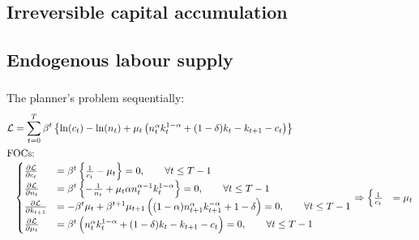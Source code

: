 \documentclass[]{article}
\begin{document}
\subsection{Irreversible capital accumulation}

\subsection{Endogenous labour supply}

\subsubsection{}
The planner's problem sequentially:
\begin{equation}
	\begin{split}
		\mathcal{L}& = \sum\limits_{t = 0}^T\beta^t\begin{Bmatrix}\ln(c_t) - \ln(n_t) + \mu_t\begin{pmatrix}n_t^\alpha k_t^{1 - \alpha} + (1 - \delta)k_t - k_{t+1} - c_t\end{pmatrix}\end{Bmatrix} \nonumber \\
		\intertext{FOCs:}
		&\begin{cases}
			\frac{\partial\mathcal{L}}{\partial c_t}& = \beta^t\begin{Bmatrix}\frac{1}{c_t} - \mu_t\end{Bmatrix} = 0, \qquad
			\forall t\leq T - 1 \\
			\frac{\partial\mathcal{L}}{\partial n_t}& = \beta^t\begin{Bmatrix}-\frac{1}{n_t} + \mu_t\alpha n_t^{\alpha - 1}k_t^{1 - \alpha}\end{Bmatrix} = 0, \qquad\forall t\leq T - 1 \\
			\frac{\partial\mathcal{L}}{\partial k_{t+1}}& = -\beta^t\mu_t + \beta^{t+1}\mu_{t+1}\begin{pmatrix}(1 - \alpha)n_{t+1}^\alpha k_{t+1}^{ - \alpha} + 1 - \delta\end{pmatrix} = 0, \qquad\forall t\leq T - 1 \\
			\frac{\partial\mathcal{L}}{\partial \mu_t}& = \beta^t\begin{pmatrix}n_t^\alpha k_t^{1 - \alpha} + (1 - \delta)k_t - k_{t+1} - c_t\end{pmatrix} = 0, \qquad\forall t\leq T-1
		\end{cases} \Rightarrow 
		\begin{cases}
			\frac{1}{c_t}& = \mu_t \\

\end{cases}
\end{split}
\end{equation}
\end{document}
